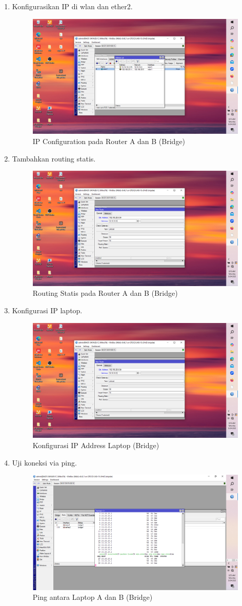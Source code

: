 \begin{enumerate}
    \item Konfigurasikan IP di wlan dan ether2.
    \begin{figure}[H]
        \centering
        \includegraphics[width=0.5\linewidth]{gambar4.png}
        \caption{IP Configuration pada Router A dan B (Bridge)}
        \label{fig:ip-bridge}
    \end{figure}

    \item Tambahkan routing statis.
    \begin{figure}[H]
        \centering
        \includegraphics[width=0.5\linewidth]{gambar5.png}
        \caption{Routing Statis pada Router A dan B (Bridge)}
        \label{fig:routing-bridge}
    \end{figure}

    \item Konfigurasi IP laptop.
    \begin{figure}[H]
        \centering
        \includegraphics[width=0.5\linewidth]{gambar5.png}
        \caption{Konfigurasi IP Address Laptop (Bridge)}
        \label{fig:ip-laptop-bridge}
    \end{figure}

    \item Uji koneksi via ping.
    \begin{figure}[H]
        \centering
        \includegraphics[width=0.5\linewidth]{ping3.png}
        \caption{Ping antara Laptop A dan B (Bridge)}
        \label{fig:ping-bridge}
    \end{figure}
\end{enumerate}



